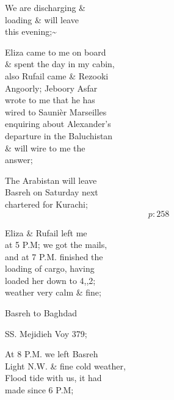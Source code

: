 \documentclass{report}
\begin{document}
	\par{
 	We are discharging \&\ \\loading \& will leave\ \\this evening;\~{}\ \\
	}

	\par{
 	Eliza came to me on board\ \\\& spent the day in my cabin,\ \\also Rufail came \& Rezooki\ \\Angoorly; Jeboory Asfar\ \\wrote to me that he has\ \\wired to Saunièr Marseilles\ \\enquiring about Alexander’s\ \\departure in the Baluchistan\ \\\& will wire to me the\ \\answer;\ \\
	}

	\par{
 	The Arabistan will leave\ \\Basreh on Saturday next\ \\chartered for Kurachi;\ \\
  \[p: 258 \]

	}


	\par{
 	Eliza \& Rufail left me\ \\at 5 P.M; we got the mails,\ \\and at 7 P.M. finished the\ \\loading of cargo, having\ \\loaded her down to 4,,2;\ \\weather very calm \& fine;\ \\
	}

	\par{
 	Basreh to Baghdad\ \\
	}

	\par{
 	SS. Mejidieh Voy 379;\ \\
	}

	\par{
 	At 8 P.M. we left Basreh\ \\Light N.W. \& fine cold weather,\ \\Flood tide with us, it had\ \\made since 6 P.M;\ \\
	}
\end{document}
